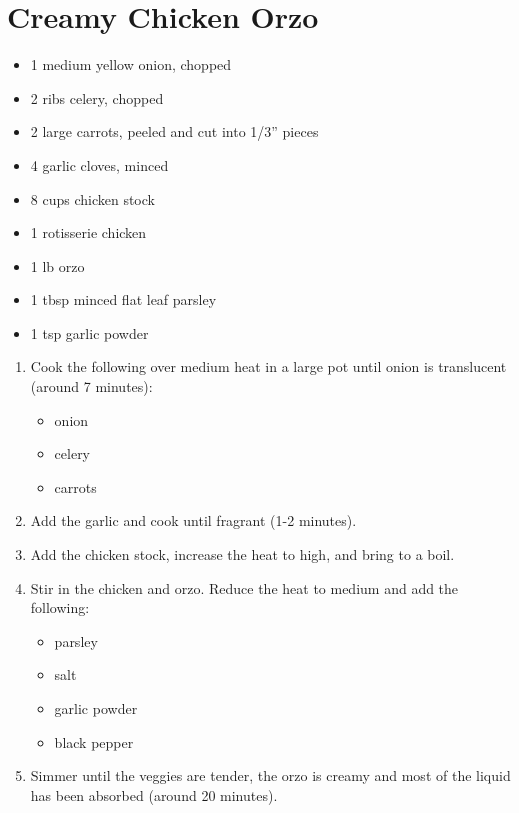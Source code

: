 \section{Creamy Chicken Orzo}

\begin{itemize}
\item 1 medium yellow onion, chopped
\item 2 ribs celery, chopped
\item 2 large carrots, peeled and cut into 1/3” pieces
\item 4 garlic cloves, minced
\item 8 cups chicken stock
\item 1 rotisserie chicken
\item 1 lb orzo
\item 1 tbsp minced flat leaf parsley
\item 1 tsp garlic powder
\end{itemize}

\begin{enumerate}
\item Cook the following over medium heat in a large pot until onion is translucent (around 7 minutes):
\begin{itemize}
    \item onion
    \item celery
    \item carrots
\end{itemize}
\item Add the garlic and cook until fragrant (1-2 minutes).
\item Add the chicken stock, increase the heat to high, and bring to a boil.
\item Stir in the chicken and orzo. Reduce the heat to medium and add the following:
\begin{itemize}
    \item parsley
    \item salt
    \item garlic powder
    \item black pepper
\end{itemize}
\item Simmer until the veggies are tender, the orzo is creamy and most of the liquid has been absorbed (around 20
    minutes).
\end{enumerate}
